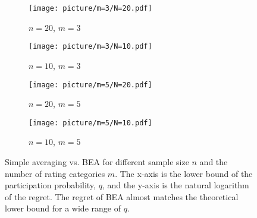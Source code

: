 \begin{figure}[htbp]
    \centering
    \begin{subfigure}[t]{0.45\columnwidth}
        \centering
        \texttt{[image: picture/m=3/N=20.pdf]}
        \caption{$n=20$, $m=3$}
    \end{subfigure}
    \hfill
    \begin{subfigure}[t]{0.45\columnwidth}
        \centering
        \texttt{[image: picture/m=3/N=10.pdf]}
        \caption{$n=10$, $m=3$}
    \end{subfigure}
    
    \vspace{0.01\textheight} 
    
    \begin{subfigure}[t]{0.45\columnwidth}
        \centering
        \texttt{[image: picture/m=5/N=20.pdf]}
        \caption{$n=20$, $m=5$}
    \end{subfigure}
    \hfill
    \begin{subfigure}[t]{0.45\columnwidth}
        \centering
        \texttt{[image: picture/m=5/N=10.pdf]}
        \caption{$n=10$, $m=5$}
    \end{subfigure}
    
    \caption{Simple averaging vs. BEA for different sample size $n$ and the number of rating categories $m$. The x-axis is the lower bound of the participation probability, $q$, and the y-axis is the natural logarithm of the regret. The regret of BEA almost matches the theoretical lower bound for a wide range of $q$.}
    \label{fig:regret}
\end{figure}



